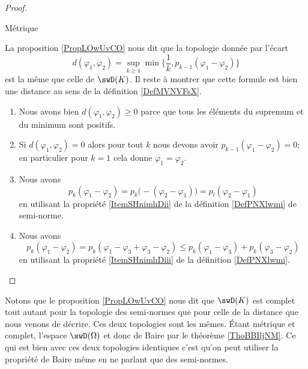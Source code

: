 \begin{proof}
\begin{subproof}
        \item[Métrique]

            La proposition \ref{PropLOwUvCO} nous dit que la topologie donnée par l'écart 
            \begin{equation}
                d(\varphi_1,\varphi_2)=\sup_{k\geq 1}\min\{ \frac{1}{ k },p_{k-1}(\varphi_1-\varphi_2) \}
            \end{equation}
            est la même que celle de \( \swD(K)\). Il reste à montrer que cette formule est bien une distance au sens de la définition \ref{DefMVNVFsX}.
            \begin{enumerate}
                \item
                    Nous avons bien \( d(\varphi_1,\varphi_2)\geq 0\) parce que tous les éléments du supremum et du minimum sont positifs.
                \item
                    Si \( d(\varphi_1,\varphi_2)=0\) alors pour tout \( k\) nous devons avoir \( p_{k-1}(\varphi_1-\varphi_2)=0\); en particulier pour \( k=1\) cela donne \( \varphi_1=\varphi_2\).
                \item
                    Nous avons
                    \begin{equation}
                        p_k(\varphi_1-\varphi_2)=p_k\big( -(\varphi_2-\varphi_1) \big)=p_l(\varphi_2-\varphi_1)
                    \end{equation}
                    en utilisant la propriété \ref{ItemSHnimhDii} de la définition \ref{DefPNXlwmi} de semi-norme.
                \item
                    Nous avons
                    \begin{equation}
                        p_k(\varphi_1-\varphi_2)=p_k(\varphi_1-\varphi_3+\varphi_3-\varphi_2)\leq p_k(\varphi_1-\varphi_3)+p_k(\varphi_3-\varphi_2)
                    \end{equation}
                    en utilisant la propriété \ref{ItemSHnimhDiii} de la définition \ref{DefPNXlwmi}.
            \end{enumerate}
        \end{subproof}
\end{proof}
Notons que le proposition \ref{PropLOwUvCO} nous dit que \( \swD(K)\) est complet tout autant pour la topologie des semi-normes que pour celle de la distance que nous venons de décrire. Ces deux topologies sont les mêmes. Étant métrique et complet, l'espace \( \swD(\Omega)\) et donc de Baire par le théorème \ref{ThoBBIljNM}. Ce qui est bien avec ces deux topologies identiques c'est qu'on peut utiliser la propriété de Baire même en ne parlant que des semi-normes.

